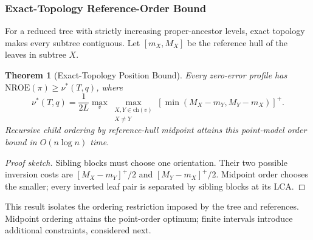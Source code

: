 \documentclass[review]{vgtc}
\newtheorem{theorem}{Theorem}
\newcommand{\nroe}{\mathrm{NROE}}
\begin{document}
\subsubsection{Exact-Topology Reference-Order Bound}
For a reduced tree with strictly increasing proper-ancestor levels, exact topology makes every subtree contiguous. Let $[m_X,M_X]$ be the reference hull of the leaves in subtree $X$.
\begin{theorem}[Exact-Topology Position Bound]\label{thm:order}
Every zero-error profile has $\nroe(\pi)\ge\nu^*(T,q)$, where
\begin{equation}\label{eq:nu}
 \nu^*(T,q)=\frac{1}{2L}\max_v\max_{\substack{X,Y\in\mathrm{ch}(v)\\X\ne Y}}
 [\min(M_X-m_Y,M_Y-m_X)]^+.
\end{equation}
Recursive child ordering by reference-hull midpoint attains this point-model order bound in $O(n\log n)$ time.
\end{theorem}
\begin{proof}[Proof sketch]
Sibling blocks must choose one orientation. Their two possible inversion costs are $[M_X-m_Y]^+/2$ and $[M_Y-m_X]^+/2$. Midpoint order chooses the smaller; every inverted leaf pair is separated by sibling blocks at its LCA.
\end{proof}
This result isolates the ordering restriction imposed by the tree and references. Midpoint ordering attains the point-order optimum; finite intervals introduce additional constraints, considered next.
\end{document}
